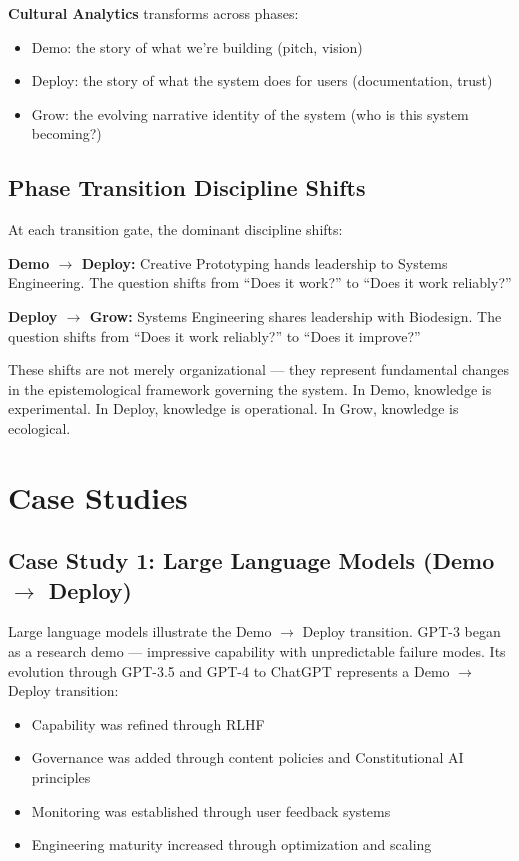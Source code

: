 \documentclass[11pt,a4paper]{article}
\begin{document}
\textbf{Cultural Analytics} transforms across phases:
\begin{itemize}[nosep]
    \item Demo: the story of what we're building (pitch, vision)
    \item Deploy: the story of what the system does for users (documentation, trust)
    \item Grow: the evolving narrative identity of the system (who is this system becoming?)
\end{itemize}

\subsection{Phase Transition Discipline Shifts}

At each transition gate, the dominant discipline shifts:

\textbf{Demo $\rightarrow$ Deploy:} Creative Prototyping hands leadership to Systems Engineering. The question shifts from ``Does it work?'' to ``Does it work reliably?''

\textbf{Deploy $\rightarrow$ Grow:} Systems Engineering shares leadership with Biodesign. The question shifts from ``Does it work reliably?'' to ``Does it improve?''

These shifts are not merely organizational --- they represent fundamental changes in the epistemological framework governing the system. In Demo, knowledge is experimental. In Deploy, knowledge is operational. In Grow, knowledge is ecological.

\section{Case Studies}

\subsection{Case Study 1: Large Language Models (Demo $\rightarrow$ Deploy)}

Large language models illustrate the Demo $\rightarrow$ Deploy transition. GPT-3 \cite{brown2020} began as a research demo --- impressive capability with unpredictable failure modes. Its evolution through GPT-3.5 and GPT-4 to ChatGPT represents a Demo $\rightarrow$ Deploy transition:
\begin{itemize}[nosep]
    \item Capability was refined through RLHF \cite{ouyang2022}
    \item Governance was added through content policies and Constitutional AI principles \cite{bai2022}
    \item Monitoring was established through user feedback systems
    \item Engineering maturity increased through optimization and scaling
\end{itemize}
\end{document}
